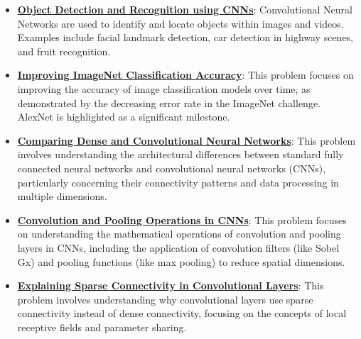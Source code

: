 \documentclass{article}%
\begin{document}
\begin{itemize}[leftmargin=*]
\item \href{https://purdue.brightspace.com/d2l/common/assets/pdfjs-d2l-dist/1.0.14-legacy/web/viewer.html?file=\%2Fcontent\%2Fenforced\%2F1095467-wl.202510.CS.24300.001\%2F09L1-cnn.pdf\%3Fou\%3D1095467\&lang=en-us\&container=d2l-fileviewer-rendered-pdf\&fullscreen=d2l-fileviewer-rendered-pdf-dialog\&height=667#page=2}{\textbf{Object Detection and Recognition using CNNs}}: Convolutional Neural Networks are used to identify and locate objects within images and videos. Examples include facial landmark detection, car detection in highway scenes, and fruit recognition.%
\item \href{https://purdue.brightspace.com/d2l/common/assets/pdfjs-d2l-dist/1.0.14-legacy/web/viewer.html?file=\%2Fcontent\%2Fenforced\%2F1095467-wl.202510.CS.24300.001\%2F09L1-cnn.pdf\%3Fou\%3D1095467\&lang=en-us\&container=d2l-fileviewer-rendered-pdf\&fullscreen=d2l-fileviewer-rendered-pdf-dialog\&height=667#page=3}{\textbf{Improving ImageNet Classification Accuracy}}: This problem focuses on improving the accuracy of image classification models over time, as demonstrated by the decreasing error rate in the ImageNet challenge. AlexNet is highlighted as a significant milestone.%
\item \href{https://purdue.brightspace.com/d2l/common/assets/pdfjs-d2l-dist/1.0.14-legacy/web/viewer.html?file=\%2Fcontent\%2Fenforced\%2F1095467-wl.202510.CS.24300.001\%2F09L1-cnn.pdf\%3Fou\%3D1095467\&lang=en-us\&container=d2l-fileviewer-rendered-pdf\&fullscreen=d2l-fileviewer-rendered-pdf-dialog\&height=667#page=4}{\textbf{Comparing Dense and Convolutional Neural Networks}}: This problem involves understanding the architectural differences between standard fully connected neural networks and convolutional neural networks (CNNs), particularly concerning their connectivity patterns and data processing in multiple dimensions.%
\item \href{https://purdue.brightspace.com/d2l/common/assets/pdfjs-d2l-dist/1.0.14-legacy/web/viewer.html?file=\%2Fcontent\%2Fenforced\%2F1095467-wl.202510.CS.24300.001\%2F09L1-cnn.pdf\%3Fou\%3D1095467\&lang=en-us\&container=d2l-fileviewer-rendered-pdf\&fullscreen=d2l-fileviewer-rendered-pdf-dialog\&height=667#page=6}{\textbf{Convolution and Pooling Operations in CNNs}}: This problem focuses on understanding the mathematical operations of convolution and pooling layers in CNNs, including the application of convolution filters (like Sobel Gx) and pooling functions (like max pooling) to reduce spatial dimensions.%
\item \href{https://purdue.brightspace.com/d2l/common/assets/pdfjs-d2l-dist/1.0.14-legacy/web/viewer.html?file=\%2Fcontent\%2Fenforced\%2F1095467-wl.202510.CS.24300.001\%2F09L1-cnn.pdf\%3Fou\%3D1095467\&lang=en-us\&container=d2l-fileviewer-rendered-pdf\&fullscreen=d2l-fileviewer-rendered-pdf-dialog\&height=667#page=10}{\textbf{Explaining Sparse Connectivity in Convolutional Layers}}: This problem involves understanding why convolutional layers use sparse connectivity instead of dense connectivity, focusing on the concepts of local receptive fields and parameter sharing.%

\end{itemize}
\end{document}

